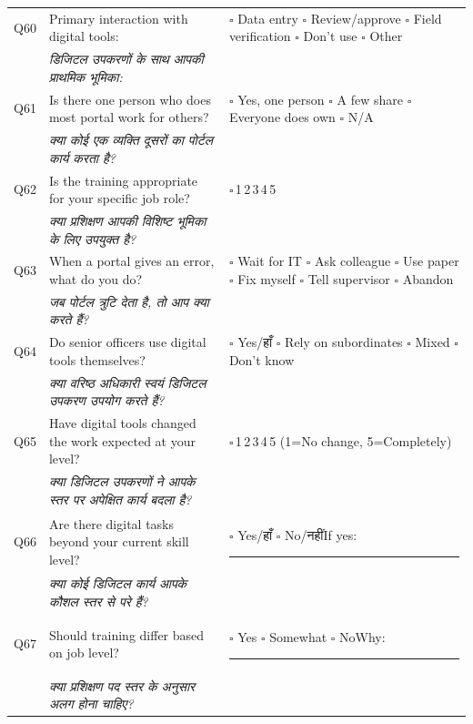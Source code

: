 \documentclass[10pt,a4paper]{article}
\newcommand{\likert}{{\Large$\square$}\,1\quad{\Large$\square$}\,2\quad{\Large$\square$}\,3\quad{\Large$\square$}\,4\quad{\Large$\square$}\,5}
\begin{document}
\noindent\begin{tabularx}{\textwidth}{@{}L{0.8cm} X L{5.2cm}@{}}
Q60 & Primary interaction with digital tools: & {\Large$\square$} Data entry {\Large$\square$} Review/approve {\Large$\square$} Field verification {\Large$\square$} Don't use {\Large$\square$} Other \\
 & {\hindifont\small\itshape\color{black!70} डिजिटल उपकरणों के साथ आपकी प्राथमिक भूमिका:} & \\[3pt]
Q61 & Is there one person who does most portal work for others? & {\Large$\square$} Yes, one person {\Large$\square$} A few share {\Large$\square$} Everyone does own {\Large$\square$} N/A \\
 & {\hindifont\small\itshape\color{black!70} क्या कोई एक व्यक्ति दूसरों का पोर्टल कार्य करता है?} & \\[3pt]
Q62 & Is the training appropriate for your specific job role? & \likert \\
 & {\hindifont\small\itshape\color{black!70} क्या प्रशिक्षण आपकी विशिष्ट भूमिका के लिए उपयुक्त है?} & \\[3pt]
Q63 & When a portal gives an error, what do you do? & {\Large$\square$} Wait for IT {\Large$\square$} Ask colleague {\Large$\square$} Use paper {\Large$\square$} Fix myself {\Large$\square$} Tell supervisor {\Large$\square$} Abandon \\
 & {\hindifont\small\itshape\color{black!70} जब पोर्टल त्रुटि देता है, तो आप क्या करते हैं?} & \\[3pt]
Q64 & Do senior officers use digital tools themselves? & {\Large$\square$} Yes/{\hindifont हाँ} {\Large$\square$} Rely on subordinates {\Large$\square$} Mixed {\Large$\square$} Don't know \\
 & {\hindifont\small\itshape\color{black!70} क्या वरिष्ठ अधिकारी स्वयं डिजिटल उपकरण उपयोग करते हैं?} & \\[3pt]
Q65 & Have digital tools changed the work expected at your level? & \likert{} {\scriptsize(1=No change, 5=Completely)} \\
 & {\hindifont\small\itshape\color{black!70} क्या डिजिटल उपकरणों ने आपके स्तर पर अपेक्षित कार्य बदला है?} & \\[3pt]
Q66 & Are there digital tasks beyond your current skill level? & {\Large$\square$} Yes/{\hindifont हाँ} {\Large$\square$} No/{\hindifont नहीं}\quad If yes: \rule{4cm}{0.4pt} \\
 & {\hindifont\small\itshape\color{black!70} क्या कोई डिजिटल कार्य आपके कौशल स्तर से परे हैं?} & \\[3pt]
Q67 & Should training differ based on job level? & {\Large$\square$} Yes {\Large$\square$} Somewhat {\Large$\square$} No\quad Why: \rule{3.5cm}{0.4pt} \\
 & {\hindifont\small\itshape\color{black!70} क्या प्रशिक्षण पद स्तर के अनुसार अलग होना चाहिए?} & \\[3pt]
\end{tabularx}
\end{document}
